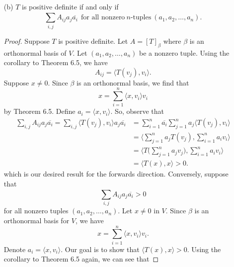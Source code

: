 \begin{enumerate}
\begin{proof}
        \end{proof}
    \item[(b)] \( T  \) is positive definite if and only if 
        \[ \sum_{ i,j }^{  } {A}_{ij} {a}_{j} \overline{{a}_{i} } \ \ \text{for all nonzero} \ n  \text{-tuples} \  ({a}_{1}, {a}_{2}, \dots, {a}_{n}).  \]
        \begin{proof}
        Suppose \( T  \) is positive definite. Let \( A = [T]_{\beta} \) where \( \beta  \) is an orthonormal basis of \( V  \). Let \( ({a}_{1}, {a}_{2}, \dots, {a}_{n}) \) be a nonzero tuple. Using the corollary to Theorem 6.5, we have 
        \[  {A}_{ij} = \langle T({v}_{j}) , {v}_{i} \rangle. \] Suppose \( x \neq 0  \). 
        Since \( \beta  \) is an orthonormal basis, we find that
        \[  x = \sum_{ i=1  }^{ n } \langle x , {v}_{i} \rangle {v}_{i} \]
        by Theorem 6.5. Define \( {a}_{i} = \langle x , {v}_{i}  \rangle  \). So, observe that
        \begin{align*}
            \sum_{ i,j }^{  } {A}_{ij} {a}_{j} \overline{{a}_{i}} = \sum_{ i,j  }^{  } \langle T({v}_{j}) , {v}_{i} \rangle {a}_{j} \overline{{a}_{i}} &= \sum_{ i=1  }^{n  } \overline{{a}_{i}} \sum_{ j=1  }^{ n } {a}_{j} \langle T({v}_{j}) , {v}_{i} \rangle   \\
                                                                                                                                                       &=  \Big\langle \sum_{ j=1  }^{ n } {a}_{j} T({v}_{j}) , \sum_{ i=1  }^{ n } {a}_{i} {v}_{i} \Big\rangle \\
                                                                                                                                                       &= \Big\langle T \Big(  \sum_{ j=1  }^{ n } {a}_{j} {v}_{j} \Big), \sum_{ i=1  }^{ n } {a}_{i} {v}_{i} \Big\rangle \\
                                                                                                                                                       &= \langle T(x) , x \rangle > 0.
        \end{align*}
        which is our desired result for the forwards direction. Conversely, suppose that 
        \[ \sum_{ i,j }^{  } {A}_{ij} {a}_{j} \overline{{a}_{i}} > 0   \]
        for all nonzero tuples \( ({a}_{1}, {a}_{2}, \dots, {a}_{n})  \). Let \( x \neq 0  \) in \( V  \). Since \( \beta  \) is an orthonormal basis for \( V  \), we have 
        \[  x = \sum_{ i=1  }^{ n } \langle x , {v}_{i} \rangle {v}_{i}. \]
        Denote \( {a}_{i} = \langle x  , {v}_{i}  \rangle \). Our goal is to show that \( \langle T(x) , x \rangle > 0  \). Using the corollary to Theorem 6.5 again, we can see that

\end{proof}
\end{enumerate}

